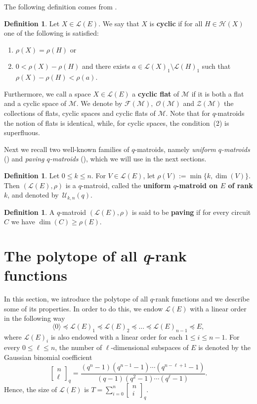 \documentclass[a4paper,11pt,reqno]{amsart}
\theoremstyle{definition}
\newtheorem{definition}[theorem]{{{Definition}}}
\newcommand{\mM}{\mathcal{M}}
\newcommand{\mL}{\mathcal{L}}
\newcommand{\mU}{\mathcal{U}}
\newcommand{\mF}{\mathcal{F}}
\newcommand{\mO}{\mathcal{O}}
\newcommand{\mZ}{\mathcal{Z}}
\newcommand{\mH}{\mathcal{H}}
\newcommand{\la}{\langle}
\newcommand{\ra}{\rangle}
\newcommand\qqbin[2]{\left[\begin{matrix} #1 \\ #2 \end{matrix} \right]}
\begin{document}
{The following definition comes from \cite[Def. 4.2]{byrne2023cyclic}.

\begin{definition}\label{def:cyc_spaces}
Let $X\in\mL(E)$. We say that $X$ is \textbf{cyclic} if for all $H\in\mH(X)$ one of the following is satisfied:
\begin{enumerate}
    \item $\rho(X)=\rho(H)$ or
    \item $0 < \rho(X) - \rho(H)$ and there exists $ a\in \mL(X)_1\setminus \mL(H)_1$ such that $\rho(X) - \rho(H) < \rho(a)$.
\end{enumerate}
\end{definition}

Furthermore, we call a space $X\in\mL(E)$ a \textbf{cyclic flat} of $\mM$ if it is both a flat and a cyclic space of $\mM$.  We denote by $\mF(\mM), \; \mO(\mM)$ and $\mZ(\mM)$ the collections of flats, cyclic spaces and cyclic flats of $\mM$. Note that for $q$-matroids the notion of flats is identical, while, for cyclic spaces, the condition~(2) is superfluous.

Next we recall two well-known families of $q$-matroids, namely \emph{uniform $q$-matroids} (\cite{jurrius2018defining}) and \emph{paving $q$-matroids} (\cite{luerssen2023representabilitydirectsum}), which we will use in the next sections.

\begin{definition}\label{def:uniform}
Let $0\leq k\leq n$. For $V\in\mL(E)$, let $\rho(V) :=\min\{k,\dim(V)\}$. Then $(\mL(E),\rho)$ is a $q$-matroid, called the \textbf{uniform $q$-matroid on $E$ of rank $k$}, and denoted by~$\mU_{k,n}(q)$.
\end{definition}

\begin{definition}
    A $q$-matroid $(\mL(E),\rho)$ is said to be \textbf{paving} if for every  circuit $C$ we have $\dim(C)\geq\rho(E)$.
\end{definition}




\section{The polytope of all \emph{q}-rank functions}\label{sec: polytope}

In this section, we introduce the polytope of all $q$-rank functions and we describe some of its properties. In order to do this, we endow $\mL(E)$ with a linear order in the following way
\[
   \la 0\ra \preceq \mL(E)_1 \preceq \mL(E)_2 \preceq \ldots \preceq \mL(E)_{n-1} \preceq E,  
\]
where $\mL(E)_i$ is also endowed with a linear order for each $1\leq i\leq n-1 $. 
For every $0\leq\ell\leq n$, the number of $\ell$-dimensional subspaces of $E$ is denoted by the Gaussian binomial coefficient
$$\qqbin{n}{\ell}_q=\frac{(q^n-1)(q^{n-1}-1)\cdots(q^{n-\ell+1}-1)}{(q-1)(q^2-1)\cdots(q^\ell-1)}.$$
Hence, the size of $\mL(E)$ is $T=\sum\limits_{i=0}^n\qqbin{n}{i}_q$.

}
\end{document}
